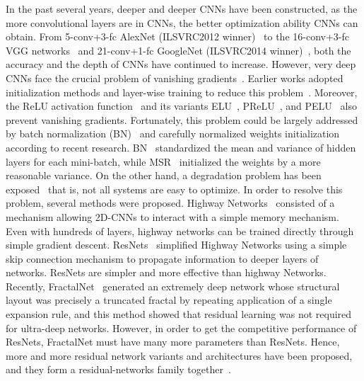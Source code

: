 \documentclass[journal]{IEEEtran}
\begin{document}
In the past several years, deeper and deeper CNNs have been constructed, as the more convolutional layers are in CNNs, the better optimization ability CNNs can obtain. From 5-conv+3-fc AlexNet (ILSVRC2012 winner)~\cite{Krizhenvshky2012dcn} to the 16-conv+3-fc VGG networks~\cite{simonyan2014vgg} and 21-conv+1-fc GoogleNet (ILSVRC2014 winner)~\cite{szegedy2015googlenet}, both the accuracy and the depth of CNNs have continued to increase. However, very deep CNNs face the crucial problem of vanishing gradients~\cite{bengio2014vanish}. Earlier works adopted initialization methods and layer-wise training to reduce this problem~\cite{glorot2010earlywork,erhan2010earlywork}. Moreover, the ReLU activation function~\cite{nair2010relu} and its variants ELU~\cite{clevert2015elu}, PReLU~\cite{he2015prelu}, and PELU~\cite{trottier2016pelu} also prevent vanishing gradients. Fortunately, this problem could be largely addressed by batch normalization (BN)~\cite{ioffe2015bn} and carefully normalized weights initialization~\cite{he2015prelu,mishkin2015initial} according to recent research. BN~\cite{ioffe2015bn} standardized the mean and variance of hidden layers for each mini-batch, while MSR~\cite{he2015prelu} initialized the weights by a more reasonable variance. On the other hand, a degradation problem has been exposed~\cite{he2015resnets,he2015timecost,sriva2015highway} that is, not all systems are easy to optimize. In order to resolve this problem, several methods were proposed. Highway Networks~\cite{sriva2015highway} consisted of a mechanism allowing 2D-CNNs to interact with a simple memory mechanism. Even with hundreds of layers, highway networks can be trained directly through simple gradient descent. ResNets~\cite{he2015resnets} simplified Highway Networks using a simple skip connection mechanism to propagate information to deeper layers of networks. ResNets are simpler and more effective than highway Networks. Recently, FractalNet~\cite{larsson2016fractalnet} generated an extremely deep network whose structural layout was precisely a truncated fractal by repeating application of a single expansion rule, and this method showed that residual learning was not required for ultra-deep networks. However, in order to get the competitive performance of ResNets, FractalNet must have many more parameters than ResNets. Hence, more and more residual network variants and architectures have been proposed, and they form a residual-networks family together~\cite{he2016preresnets,zagoruyko2016wrn,huang2016SD,trottier2016pelu,targ2016rir,shah2016elu,singh2016swapout,shen2016wresnets,moniz2016crmn}.
\end{document}
